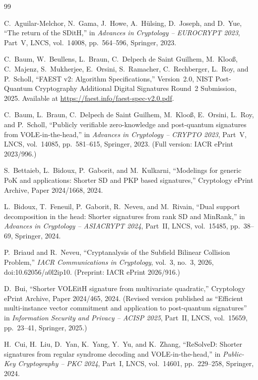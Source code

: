 \documentclass[11pt,a4paper]{article}
\theoremstyle{definition}
\theoremstyle{remark}
\begin{document}
\begin{thebibliography}{99}

C.~Aguilar-Melchor, N.~Gama, J.~Howe, A.~H\"{u}lsing, D.~Joseph, and D.~Yue,
``The return of the SDitH,'' in \emph{Advances in Cryptology -- EUROCRYPT 2023}, Part~V, LNCS, vol.~14008, pp.~564--596, Springer, 2023.

C.~Baum, W.~Beullens, L.~Braun, C.~Delpech de Saint Guilhem, M.~Kloo\ss, C.~Majenz, S.~Mukherjee, E.~Orsini, S.~Ramacher, C.~Rechberger, L.~Roy, and P.~Scholl,
``FAEST v2: Algorithm Specifications,'' Version~2.0, NIST Post-Quantum Cryptography Additional Digital Signatures Round~2 Submission, 2025. Available at \url{https://faest.info/faest-spec-v2.0.pdf}.

C.~Baum, L.~Braun, C.~Delpech de Saint Guilhem, M.~Kloo\ss, E.~Orsini, L.~Roy, and P.~Scholl,
``Publicly verifiable zero-knowledge and post-quantum signatures from VOLE-in-the-head,'' in \emph{Advances in Cryptology -- CRYPTO 2023}, Part~V, LNCS, vol.~14085, pp.~581--615, Springer, 2023. (Full version: IACR ePrint 2023/996.)

S.~Bettaieb, L.~Bidoux, P.~Gaborit, and M.~Kulkarni,
``Modelings for generic PoK and applications: Shorter SD and PKP based signatures,'' Cryptology ePrint Archive, Paper 2024/1668, 2024.

L.~Bidoux, T.~Feneuil, P.~Gaborit, R.~Neveu, and M.~Rivain,
``Dual support decomposition in the head: Shorter signatures from rank SD and MinRank,'' in \emph{Advances in Cryptology -- ASIACRYPT 2024}, Part~II, LNCS, vol.~15485, pp.~38--69, Springer, 2024.

P.~Briaud and R.~Neveu,
``Cryptanalysis of the Subfield Bilinear Collision Problem,'' \emph{IACR Communications in Cryptology}, vol.~3, no.~3, 2026, doi:10.62056/a0l2ip10. (Preprint: IACR ePrint 2026/916.)

D.~Bui,
``Shorter VOLEitH signature from multivariate quadratic,'' Cryptology ePrint Archive, Paper 2024/465, 2024. (Revised version published as ``Efficient multi-instance vector commitment and application to post-quantum signatures'' in \emph{Information Security and Privacy -- ACISP 2025}, Part~II, LNCS, vol.~15659, pp.~23--41, Springer, 2025.)

H.~Cui, H.~Liu, D.~Yan, K.~Yang, Y.~Yu, and K.~Zhang,
``ReSolveD: Shorter signatures from regular syndrome decoding and VOLE-in-the-head,'' in \emph{Public-Key Cryptography -- PKC 2024}, Part~I, LNCS, vol.~14601, pp.~229--258, Springer, 2024.


\end{thebibliography}
\end{document}
